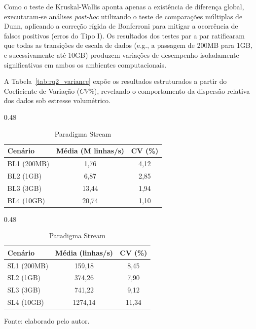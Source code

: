 Como o teste de Kruskal-Wallis aponta apenas a existência de diferença global, executaram-se análises \textit{post-hoc} utilizando o teste de comparações múltiplas de Dunn, aplicando a correção rígida de Bonferroni para mitigar a ocorrência de falsos positivos (erros do Tipo I). Os resultados dos testes par a par ratificaram que todas as transições de escala de dados (e.g., a passagem de 200MB para 1GB, e sucessivamente até 10GB) produzem variações de desempenho isoladamente significativas em ambos os ambientes computacionais.

A Tabela~\ref{tab:rq2_variance} expõe os resultados estruturados a partir do Coeficiente de Variação ($CV\%$), revelando o comportamento da dispersão relativa dos dados sob estresse volumétrico.

\begin{table}[htbp]
\centering
\caption{Análise de variabilidade operacional sob escalonamento volumétrico (RQ2).}
\label{tab:rq2_variance}
\small
\setlength{\tabcolsep}{6pt}
\begin{subtable}{0.48\linewidth}
\centering
\caption{Paradigma Batch}
\label{subtab:batch}
\begin{tabular}{lcc}
\toprule
\textbf{Cenário} & \textbf{Média (M linhas/s)} & \textbf{CV (\%)} \\
\midrule
BL1 (200MB) & 1,76  & 4,12 \\
BL2 (1GB)   & 6,87  & 2,85 \\
BL3 (3GB)   & 13,44 & 1,94 \\
BL4 (10GB)  & 20,74 & 1,10 \\
\bottomrule
\end{tabular}
\end{subtable}
\hfill
\begin{subtable}{0.48\linewidth}
\centering
\caption{Paradigma Stream}
\label{subtab:stream}
\begin{tabular}{lcc}
\toprule
\textbf{Cenário} & \textbf{Média (linhas/s)} & \textbf{CV (\%)} \\
\midrule
SL1 (200MB) & 159,18  & 8,45 \\
SL2 (1GB)   & 374,26  & 7,90 \\
SL3 (3GB)   & 741,22  & 9,12 \\
SL4 (10GB)  & 1274,14 & 11,34 \\
\bottomrule
\end{tabular}
\end{subtable}
\vspace{0.3em}
\begin{flushleft}
\footnotesize Fonte: elaborado pelo autor.
\end{flushleft}
\end{table}

